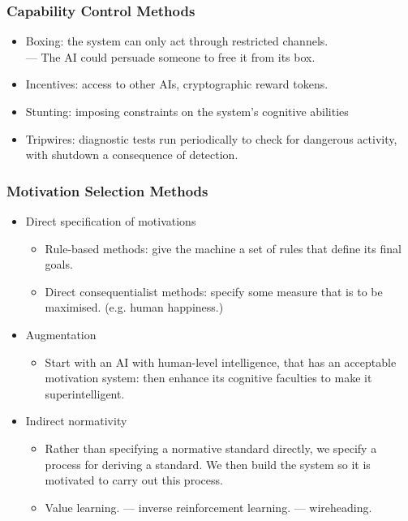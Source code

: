 \documentclass[UTF8,11pt,colorlinks,compress,openany]{beamer}%
\begin{document}
\begin{frame}\frametitle{Capability Control Methods}
\begin{itemize}
	\item Boxing: the system can only act through restricted channels.\\
	--- The AI could persuade someone to free it from its box.
	\item Incentives: access to other AIs, cryptographic reward tokens.
	\item Stunting: imposing constraints on the system's cognitive abilities
	\item Tripwires: diagnostic tests run periodically to check for dangerous activity, with shutdown a consequence of detection.
\end{itemize}
\end{frame}

\begin{frame}\frametitle{Motivation Selection Methods}
\begin{itemize}
	\item Direct specification of motivations
		\begin{itemize}
			\item Rule-based methods: give the machine a set of rules that define its final goals.
			\item Direct consequentialist methods: specify some measure that is to be maximised. (e.g. human happiness.)
		\end{itemize}
	\item Augmentation
		\begin{itemize}
			\item Start with an AI with human-level intelligence, that has an acceptable motivation system: then enhance its cognitive faculties to make it superintelligent.
		\end{itemize}
	\item Indirect normativity
		\begin{itemize}
			\item Rather than specifying a normative standard directly, we specify a process for deriving a standard. We then build the system so it is motivated to carry out this process.
			\item Value learning. --- inverse reinforcement learning. --- wireheading.
		\end{itemize}
\end{itemize}
\end{frame}
\end{document}
